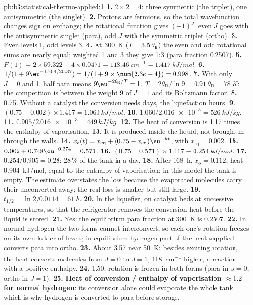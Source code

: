 \begin{solution}{pb:b3:statistical-thermo-applied:1}
\textbf{1.} $2 \times 2 = 4$: three symmetric (the triplet), one antisymmetric (the singlet).
\textbf{2.} Protons are fermions, so the total wavefunction changes sign on
exchange; the rotational function gives $(-1)^J$: even $J$ goes with the
antisymmetric singlet (para), odd $J$ with the symmetric triplet (ortho).
\textbf{3.} Even levels 1, odd levels 3.
\textbf{4.} At \qty{300}{K} ($T = 3.5\,\theta_{\mathrm R}$) the even and odd rotational sums are nearly equal;
weighted 1 and 3 they give 1:3 (para fraction 0.2507).
\textbf{5.} $F(1) = 2 \times 59.322 - 4 \times 0.0471 = \qty{118.46}{cm^{-1}} = \qty{1.417}{kJ/mol}$.
\textbf{6.} $1/(1 + 9\eu^{-170.4/20.37}) = 1/(1 + 9 \times \num{2.3e-4}) = 0.998$.
\textbf{7.} With only $J = 0$ and 1, half para means $9\eu^{-2\theta_{\mathrm R}/T} = 1$, $T = 2\theta_{\mathrm R}/\ln9 =
0.91\,\theta_{\mathrm R} = \qty{78}{K}$: the competition is between the weight 9 of $J = 1$ and its
Boltzmann factor.
\textbf{8.} 0.75. Without a catalyst the conversion needs days, the liquefaction
hours.
\textbf{9.} $(0.75 - 0.002) \times 1.417 = \qty{1.060}{kJ/mol}$.
\textbf{10.} $1.060/\num{2.016e-3} = \qty{526}{kJ/kg}$.
\textbf{11.} $0.905/\num{2.016e-3} = \qty{449}{kJ/kg}$.
\textbf{12.} The heat of conversion is 1.17 times the enthalpy of vaporisation.
\textbf{13.} It is produced inside the liquid, not brought in through the walls.
\textbf{14.} $x_{\mathrm o}(t) = x_{\mathrm{eq}} + (0.75 - x_{\mathrm{eq}})\eu^{-kt}$, with $x_{\mathrm{eq}} = 0.002$.
\textbf{15.} $0.002 + 0.748\eu^{-0.274} = 0.571$.
\textbf{16.} $(0.75 - 0.571) \times 1.417 = \qty{0.254}{kJ/mol}$.
\textbf{17.} $0.254/0.905 = 0.28$: 28\,\% of the tank in a day.
\textbf{18.} After \qty{168}{h}, $x_{\mathrm o} = 0.112$, heat \qty{0.904}{kJ/mol}, equal to the enthalpy of
vaporisation: in this model the tank is empty. The estimate overstates the
loss because the evaporated molecules carry their unconverted 
away; the real loss is smaller but still large.
\textbf{19.} $t_{1/2} = \ln2/0.0114 = \qty{61}{h}$.
\textbf{20.} In the liquefier, on catalyst beds at successive temperatures, so that the
refrigerator removes the conversion heat before the liquid is stored.
\textbf{21.} Yes: the equilibrium para fraction at \qty{300}{K} is 0.2507.
\textbf{22.} In normal hydrogen the two forms cannot interconvert, so each one's
rotation freezes on its own ladder of levels; in equilibrium hydrogen part of
the heat supplied converts para into ortho.
\textbf{23.} About 3.57 near \qty{50}{K}: besides exciting rotation, the heat converts
molecules from $J = 0$ to $J = 1$, \qty{118}{cm^{-1}} higher, a reaction with a positive
enthalpy.
\textbf{24.} 1.50: rotation is frozen in both forms (para in $J = 0$, ortho in $J = 1$).
\textbf{25.} \textbf{Heat of conversion / enthalpy of vaporisation $\approx 1.2$ for normal
hydrogen}: its conversion alone could evaporate the whole tank, which is why
hydrogen is converted to para before storage.
\end{solution}
